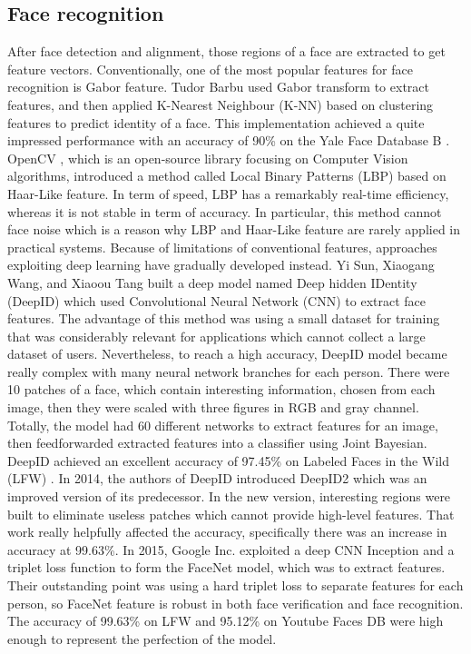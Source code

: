 \documentclass[journal, twocolumn]{IEEEtran}
\begin{document}
\subsection{Face recognition}
After face detection and alignment, those regions of a face are extracted to get feature vectors. Conventionally, one of the most popular features for face recognition is Gabor feature. Tudor Barbu \cite{ref:recog-1} used Gabor transform to extract features, and then applied K-Nearest Neighbour (K-NN) based on clustering features to predict identity of a face. This implementation achieved a quite impressed performance with an accuracy of 90\% on the Yale Face Database B \cite{ref:data-yaleB}. OpenCV \cite{ref:recog-2}, which is an open-source library focusing on Computer Vision algorithms, introduced a method called Local Binary Patterns (LBP) based on Haar-Like feature. In term of speed, LBP has a remarkably real-time efficiency, whereas it is not stable in term of accuracy. In particular, this method cannot face noise which is a reason why LBP and Haar-Like feature are rarely applied in practical systems. Because of limitations of conventional features, approaches exploiting deep learning have gradually developed instead. Yi Sun, Xiaogang Wang, and Xiaoou Tang \cite{ref:recog-3} built a deep model named Deep hidden IDentity (DeepID) which used Convolutional Neural Network (CNN) to extract face features. The advantage of this method was using a small dataset for training that was considerably relevant for applications which cannot collect a large dataset of users. Nevertheless, to reach a high accuracy, DeepID model became really complex with many neural network branches for each person. There were 10 patches of a face, which contain interesting information, chosen from each image, then they were scaled with three figures in RGB and gray channel. Totally, the model had 60 different networks to extract features for an image, then feedforwarded extracted features into a classifier using Joint Bayesian. DeepID achieved an excellent accuracy of 97.45\% on Labeled Faces in the Wild (LFW) \cite{ref:data-lfw}. In 2014, the authors of DeepID introduced DeepID2 \cite{ref:recog-4} which was an improved version of its predecessor. In the new version, interesting regions were built to eliminate useless patches which cannot provide high-level features. That work really helpfully affected the accuracy, specifically there was an increase in accuracy at 99.63\%. In 2015, Google Inc. \cite{ref:recog-5} exploited a deep CNN Inception \cite{ref:in-res} and a triplet loss function to form the FaceNet model, which was to extract features. Their outstanding point was using a hard triplet loss to separate features for each person, so FaceNet feature is robust in both face verification and face recognition. The accuracy of 99.63\% on LFW and 95.12\% on Youtube Faces DB \cite{ref:data-youtube} were high enough to represent the perfection of the model.
\end{document}
